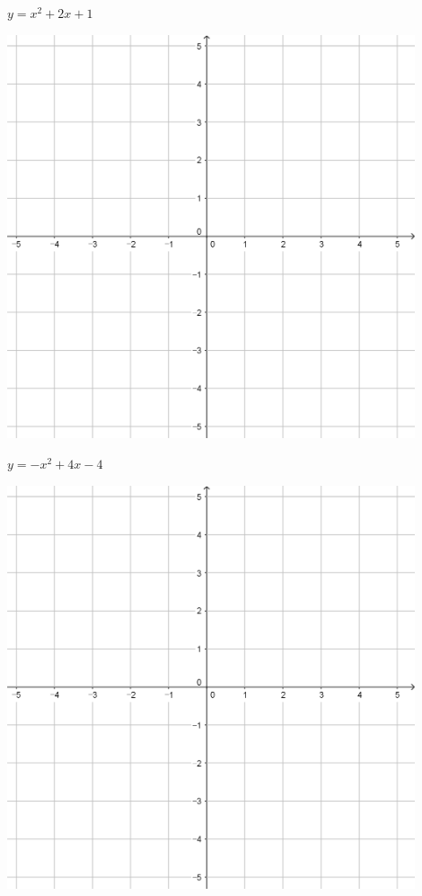 \documentclass[a4paper]{oblivoir}
\begin{document}
\clearpage
\begin{minipage}{0.45\textwidth}\centering
\(y=x^2+2x+1\)
\par\bigskip\includegraphics[width=0.9\textwidth]{55}
\end{minipage}
\begin{minipage}{0.45\textwidth}\centering
\(y=-x^2+4x-4\)
\par\bigskip\includegraphics[width=0.9\textwidth]{55}
\end{minipage}\bigskip\bigskip\par
\end{document}
